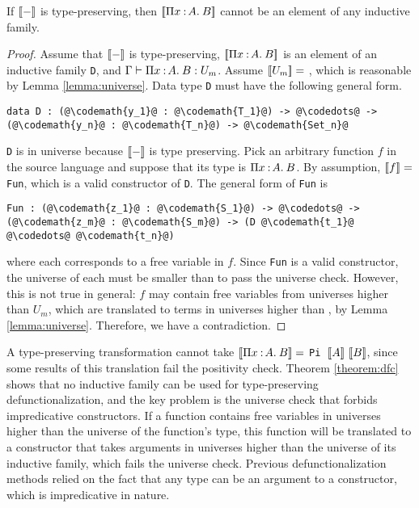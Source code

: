 \begin{theorem}
\label{theorem:dfc}
If ${[\![ - ]\!]}$ is type-preserving, then ${[\![ \Pi x\mkern1.5mu{\hspace{0.5mm}{:}\hspace{0.5mm}} A.\hspace{0.8mm}B ]\!]}$ cannot be an element of any inductive family.
\begin{proof}
Assume that ${[\![ - ]\!]}$ is type-preserving, ${[\![ \Pi x\mkern1.5mu{\hspace{0.5mm}{:}\hspace{0.5mm}} A.\hspace{0.8mm}B ]\!]}$ is an element of an inductive family \texttt{D}, and $\Gamma \vdash \Pi x\mkern1.5mu{\hspace{0.5mm}{:}\hspace{0.5mm}} A.\hspace{0.8mm}B \mathrel{:} U_m$. Assume ${[\![ U_m ]\!]} =$ , which is reasonable by Lemma \ref{lemma:universe}. Data type \texttt{D} must have the following general form.
\begin{lstlisting}[escapechar=@]
data D : (@\codemath{y_1}@ : @\codemath{T_1}@) -> @\codedots@ -> (@\codemath{y_n}@ : @\codemath{T_n}@) -> @\codemath{Set_n}@
\end{lstlisting}
\texttt{D} is in universe  because ${[\![ - ]\!]}$ is type preserving.
Pick an arbitrary function $f$ in the source language and suppose that its type is $\Pi x\mkern1.5mu{\hspace{0.5mm}{:}\hspace{0.5mm}} A.\hspace{0.8mm}B$. By assumption, ${[\![ f ]\!]} =$ \texttt{Fun}, which is a valid constructor of \texttt{D}. The general form of \texttt{Fun} is
\begin{lstlisting}[escapechar=@]
Fun : (@\codemath{z_1}@ : @\codemath{S_1}@) -> @\codedots@ -> (@\codemath{z_m}@ : @\codemath{S_m}@) -> (D @\codemath{t_1}@ @\codedots@ @\codemath{t_n}@)
\end{lstlisting}
where each  corresponds to a free variable in $f$. Since \texttt{Fun} is a valid constructor, the universe of each  must be smaller than  to pass the universe check. However, this is not true in general: $f$ may contain free variables from universes higher than $U_m$, which are translated to terms in universes higher than , by Lemma \ref{lemma:universe}. Therefore, we have a contradiction.
\end{proof}
\end{theorem}

A type-preserving transformation cannot take ${[\![ \Pi x\mkern1.5mu{\hspace{0.5mm}{:}\hspace{0.5mm}} A.\hspace{0.8mm}B ]\!]} =$ \texttt{Pi }$\bbracket{A}\ \bbracket{B}$, since some results of this translation fail the positivity check. Theorem \ref{theorem:dfc} shows that no inductive family can be used for type-preserving defunctionalization, and the key problem is the universe check that forbids impredicative constructors. If a function contains free variables in universes higher than the universe of the function's type, this function will be translated to a constructor that takes arguments in universes higher than the universe of its inductive family, which fails the universe check. Previous defunctionalization methods relied on the fact that any type can be an argument to a constructor, which is impredicative in nature.



